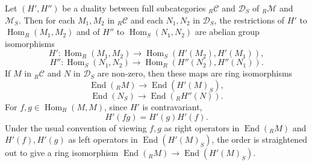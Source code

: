 Let $(H', H'')$ be a duality between full subcategories ${}_R \mathcal{C}$ and $\mathcal{D}_S$ of ${}_R \mathcal{M}$ and $\mathcal{M}_S$. Then for each $M_1, M_2$ in ${}_R \mathcal{C}$ and each $N_1, N_2$ in $\mathcal{D}_S$, the restrictions of $H'$ to $\operatorname{Hom}_R(M_1, M_2)$ and of $H''$ to $\operatorname{Hom}_S(N_1, N_2)$ are abelian group isomorphisms
$$H': \operatorname{Hom}_R(M_1, M_2) \to \operatorname{Hom}_S(H'(M_2), H'(M_1)),$$
$$H'': \operatorname{Hom}_S(N_1, N_2) \to \operatorname{Hom}_R(H''(N_2), H''(N_1)).$$
If $M$ in ${}_R \mathcal{C}$ and $N$ in $\mathcal{D}_S$ are non-zero, then these maps are ring isomorphisms
$$\operatorname{End}({}_R M) \to \operatorname{End}(H'(M)_S),$$
$$\operatorname{End}(N_S) \to \operatorname{End}({}_R H''(N)).$$
For $f, g \in \operatorname{Hom}_R(M, M)$, since $H'$ is contravariant,
$$H'(fg) = H'(g)H'(f).$$
Under the usual convention of viewing $f, g$ as right operators in $\operatorname{End}({}_R M)$ and $H'(f), H'(g)$ as left operators in $\operatorname{End}(H'(M)_S)$, the order is straightened out to give a ring isomorphism $\operatorname{End}({}_R M) \to \operatorname{End}(H'(M)_S)$.

